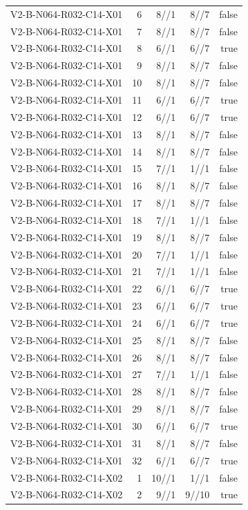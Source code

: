 {\begin{longtable}{lrrrr}
V2-B-N064-R032-C14-X01 & 6 & 8//1 & 8//7 & false \\
V2-B-N064-R032-C14-X01 & 7 & 8//1 & 8//7 & false \\
V2-B-N064-R032-C14-X01 & 8 & 6//1 & 6//7 & true \\
V2-B-N064-R032-C14-X01 & 9 & 8//1 & 8//7 & false \\
V2-B-N064-R032-C14-X01 & 10 & 8//1 & 8//7 & false \\
V2-B-N064-R032-C14-X01 & 11 & 6//1 & 6//7 & true \\
V2-B-N064-R032-C14-X01 & 12 & 6//1 & 6//7 & true \\
V2-B-N064-R032-C14-X01 & 13 & 8//1 & 8//7 & false \\
V2-B-N064-R032-C14-X01 & 14 & 8//1 & 8//7 & false \\
V2-B-N064-R032-C14-X01 & 15 & 7//1 & 1//1 & false \\
V2-B-N064-R032-C14-X01 & 16 & 8//1 & 8//7 & false \\
V2-B-N064-R032-C14-X01 & 17 & 8//1 & 8//7 & false \\
V2-B-N064-R032-C14-X01 & 18 & 7//1 & 1//1 & false \\
V2-B-N064-R032-C14-X01 & 19 & 8//1 & 8//7 & false \\
V2-B-N064-R032-C14-X01 & 20 & 7//1 & 1//1 & false \\
V2-B-N064-R032-C14-X01 & 21 & 7//1 & 1//1 & false \\
V2-B-N064-R032-C14-X01 & 22 & 6//1 & 6//7 & true \\
V2-B-N064-R032-C14-X01 & 23 & 6//1 & 6//7 & true \\
V2-B-N064-R032-C14-X01 & 24 & 6//1 & 6//7 & true \\
V2-B-N064-R032-C14-X01 & 25 & 8//1 & 8//7 & false \\
V2-B-N064-R032-C14-X01 & 26 & 8//1 & 8//7 & false \\
V2-B-N064-R032-C14-X01 & 27 & 7//1 & 1//1 & false \\
V2-B-N064-R032-C14-X01 & 28 & 8//1 & 8//7 & false \\
V2-B-N064-R032-C14-X01 & 29 & 8//1 & 8//7 & false \\
V2-B-N064-R032-C14-X01 & 30 & 6//1 & 6//7 & true \\
V2-B-N064-R032-C14-X01 & 31 & 8//1 & 8//7 & false \\
V2-B-N064-R032-C14-X01 & 32 & 6//1 & 6//7 & true \\
V2-B-N064-R032-C14-X02 & 1 & 10//1 & 1//1 & false \\
V2-B-N064-R032-C14-X02 & 2 & 9//1 & 9//10 & true \\

\end{longtable}}
